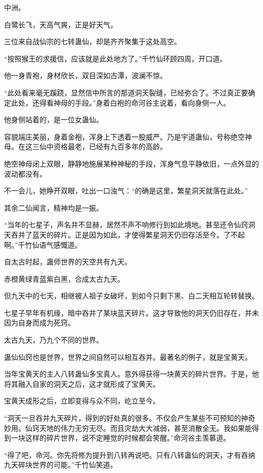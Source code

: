 
\begin{this_body}

中洲。

白鹭长飞，天高气爽，正是好天气。

三位来自战仙宗的七转蛊仙，却是齐齐聚集于这处高空。

“按照猴王的求援信，应该就是此处地方了。”千竹仙环顾四周，开口道。

他一身青袍，身材欣长，双目深如古潭，波澜不惊。

“此处看来毫无蹊跷，显然信中所言的那道洞天裂缝，已经弥合了。不过真正要确定此处，还得看神母的手段。”身着白袍的命河谷主说着，看向身侧一人。

他身侧站着的，是一位女蛊仙。

容貌端庄美丽，身着金袍，浑身上下透着一股威严。乃是宇道蛊仙，号称绝空神母。在这三仙中资格最老，已经有九百多年的高龄。

绝空神母闭上双眼，静静地施展某种神秘的手段，浑身气息平静依旧，一点外显的波动都没有。

不一会儿，她睁开双眼，吐出一口浊气：“的确是这里，繁星洞天就落在此处。”

其余二仙闻言，精神均是一振。

“当年的七星子，声名并不显赫，居然不声不响修行到如此境地。甚至还令仙窍洞天吞并了蓝天的碎片。正是因为如此，才使得繁星洞天仍旧存活至今。了不起啊。”千竹仙语气感慨道。

自太古时起，蛊师世界的天空共有九天。

赤橙黄绿青蓝紫白黑，合成太古九天。

但九天中的七天，相继被人祖子女破坏，到如今只剩下黑、白二天相互轮转替换。

七星子早年有机缘，暗中吞并了某块蓝天碎片。这才导致他的洞天仍旧存在，并未因为自身而成为死窍。

太古九天，乃九个不同的世界。

蛊仙仙窍也是世界，世界之间自然可以相互吞并。最著名的例子，就是宝黄天。

当年宝黄天的主人八转蛊仙多宝真人。意外得获得一块黄天的碎片世界。于是，他将其融入自家的洞天之后，这才就形成了宝黄天。

宝黄天成形之后，立即变得与众不同，屹立至今。

“洞天一旦吞并九天碎片，得到的好处真的很多。不仅会产生某些不可预知的神奇妙用。仙窍天地的伟力无穷无尽。而且灾劫大大减弱，甚至消散全无。我如果能得到一块这样的碎片世界，说不定睡觉的时候都会笑醒。”命河谷主羡慕道。

“得了吧，命河。你先将修为提升到八转再说吧。只有八转蛊仙的洞天，才有吞纳九天碎块世界的可能。”千竹仙笑道。


\end{this_body}
